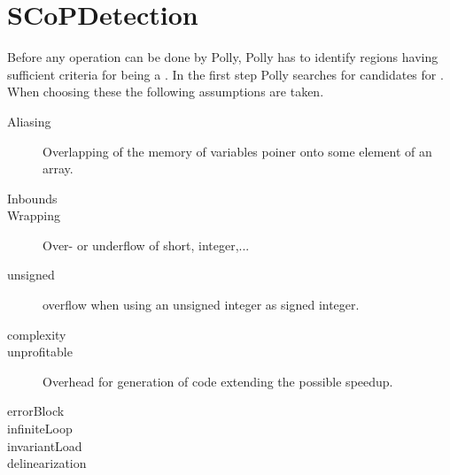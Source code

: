 \section{SCoPDetection}
Before any operation can be done by Polly, Polly has to identify regions having sufficient criteria for being a \scop.
In the first step Polly searches for candidates for \scops. When choosing these the following assumptions are taken.
\begin{description}
    \item[Aliasing] Overlapping of the memory of variables \eg poiner onto some element of an array.
    \item[Inbounds] 
    \item[Wrapping] Over- or underflow of short, integer,...
    \item[unsigned] \Eg overflow when using an unsigned integer as signed integer.
    \item[complexity] 
    \item[unprofitable] Overhead for generation of code extending the possible speedup.
    \item[errorBlock]
    \item[infiniteLoop]
    \item[invariantLoad]
    \item[delinearization]
\end{description}

